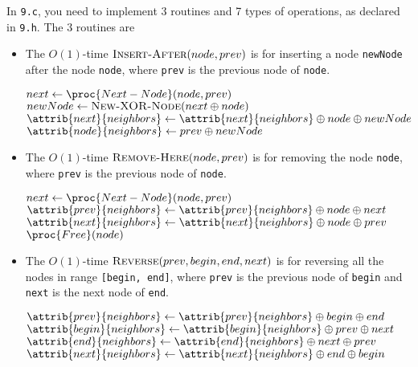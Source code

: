 In \texttt{9.c}, you need to implement 3 routines and 7 types of operations, as declared in \texttt{9.h}. The 3 routines are
\begin{itemize}
    \item The $O(1)$-time $\textsc{Insert-After}(node, prev)$ is for inserting a node \texttt{newNode} after the node \texttt{node}, where \texttt{prev} is the previous node of \texttt{node}.

\begin{codebox}
\li $next \gets \proc{Next-Node}(node, prev)$
\li $newNode \gets \textsc{New-XOR-Node}(next \oplus node)$
\li $\attrib{next}{neighbors} \gets \attrib{next}{neighbors} \oplus node \oplus newNode$
\li $\attrib{node}{neighbors} \gets prev \oplus newNode$
\End
\end{codebox}
    
    \item The $O(1)$-time $\textsc{Remove-Here}(node, prev)$ is for removing the node \texttt{node}, where \texttt{prev} is the previous node of \texttt{node}.

\begin{codebox}
\li $next \gets \proc{Next-Node}(node, prev)$
\li $\attrib{prev}{neighbors} \gets \attrib{prev}{neighbors} \oplus node \oplus next$
\li $\attrib{next}{neighbors} \gets \attrib{next}{neighbors} \oplus node \oplus prev$
\li $\proc{Free}(node)$
\End
\end{codebox}
    
    \item The $O(1)$-time $\textsc{Reverse}(prev, begin, end, next)$ is for reversing all the nodes in range \texttt{[begin, end]}, where \texttt{prev} is the previous node of \texttt{begin} and \texttt{next} is the next node of \texttt{end}.

\begin{codebox}
\li $\attrib{prev}{neighbors} \gets \attrib{prev}{neighbors} \oplus begin \oplus end$
\li $\attrib{begin}{neighbors} \gets \attrib{begin}{neighbors} \oplus prev \oplus next$
\li $\attrib{end}{neighbors} \gets \attrib{end}{neighbors} \oplus next \oplus prev$
\li $\attrib{next}{neighbors} \gets \attrib{next}{neighbors} \oplus end \oplus begin$
\End
\end{codebox}    
\end{itemize}

